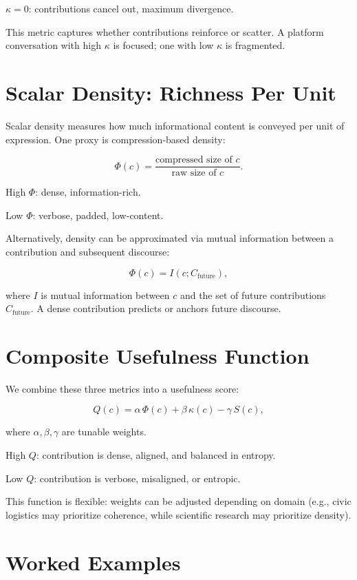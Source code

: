 \documentclass{book}
\begin{document}
\( \kappa = 0 \): contributions cancel out, maximum divergence.

This metric captures whether contributions reinforce or scatter. A platform conversation with high \( \kappa \) is focused; one with low \( \kappa \) is fragmented.

\section{Scalar Density: Richness Per Unit}

Scalar density measures how much informational content is conveyed per unit of expression. One proxy is compression-based density:

\[ \Phi(c) = \frac{\text{compressed size of } c}{\text{raw size of } c}. \]

High \( \Phi \): dense, information-rich.

Low \( \Phi \): verbose, padded, low-content.

Alternatively, density can be approximated via mutual information between a contribution and subsequent discourse:

\[ \Phi(c) = I(c; C_{\text{future}}), \]

where \( I \) is mutual information between \( c \) and the set of future contributions \( C_{\text{future}} \). A dense contribution predicts or anchors future discourse.

\section{Composite Usefulness Function}

We combine these three metrics into a usefulness score:

\[ Q(c) = \alpha \, \Phi(c) + \beta \, \kappa(c) - \gamma \, S(c), \]

where \( \alpha, \beta, \gamma \) are tunable weights.

High \( Q \): contribution is dense, aligned, and balanced in entropy.

Low \( Q \): contribution is verbose, misaligned, or entropic.

This function is flexible: weights can be adjusted depending on domain (e.g., civic logistics may prioritize coherence, while scientific research may prioritize density).

\section{Worked Examples}
\end{document}
